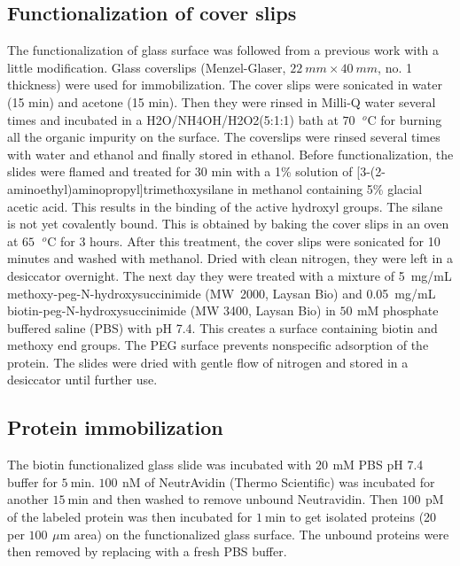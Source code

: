 \documentclass[journal=jacsat,manuscript=article]{achemso}
\newcommand{\um}{\ensuremath{\,\mu\textrm{m}}}
\newcommand{\mM}{\ensuremath{\,\textrm{mM}}}
\newcommand{\nM}{\ensuremath{\,\textrm{nM}}}
\newcommand{\pM}{\ensuremath{\,\textrm{pM}}}
\newcommand{\degree}{\ensuremath{\,~^o\textrm{C}}}
\begin{document}
\subsection{Functionalization of cover slips}
The functionalization of glass surface was followed from a previous work with a little modification.\cite{gupta2012involvement} Glass coverslips (Menzel-Glaser, $22~mm \times 40~mm$, no. 1 thickness) were used for immobilization. The cover slips were sonicated in water (15 min) and acetone (15 min). Then they were rinsed in Milli-Q water several times and incubated in a H2O/NH4OH/H2O2(5:1:1) bath at $70~\degree$ for burning all the organic impurity on the surface. The coverslips were rinsed several times with water and ethanol and finally stored in ethanol. Before functionalization, the slides were flamed and treated for 30 min with a 1\% solution of [3-(2-aminoethyl)aminopropyl]trimethoxysilane in methanol containing 5\% glacial acetic acid. This results in the binding of the active hydroxyl groups. The silane is not yet covalently bound. This is obtained by baking the cover slips in an oven at $65~\degree$ for 3 hours. After this treatment, the cover slips were sonicated for 10 minutes and washed with methanol. Dried with clean nitrogen, they were left in a desiccator overnight. The next day they were treated with a mixture of 5~mg/mL methoxy-peg-N-hydroxysuccinimide (MW~2000, Laysan Bio) and 0.05~mg/mL
biotin-peg-N-hydroxysuccinimide (MW 3400, Laysan Bio) in $50~\mM$ phosphate buffered saline (PBS) with pH 7.4. This creates a surface containing biotin and methoxy end groups. The PEG surface prevents nonspecific adsorption of the protein. The slides were dried with gentle flow of nitrogen and stored in a desiccator until further use.
\subsection{Protein immobilization}
The biotin functionalized glass slide was incubated with $20~\mM$ PBS pH 7.4 buffer for $5~$min. $100~\nM$ of NeutrAvidin (Thermo Scientific) was incubated for another $15~$min and then washed to remove unbound Neutravidin. Then $100~\pM$ of the labeled protein was then incubated for $1~$min to get isolated proteins (20 per $100~\um$ area) on the functionalized glass surface. The unbound proteins were then removed by replacing with a fresh PBS buffer.
\end{document}
